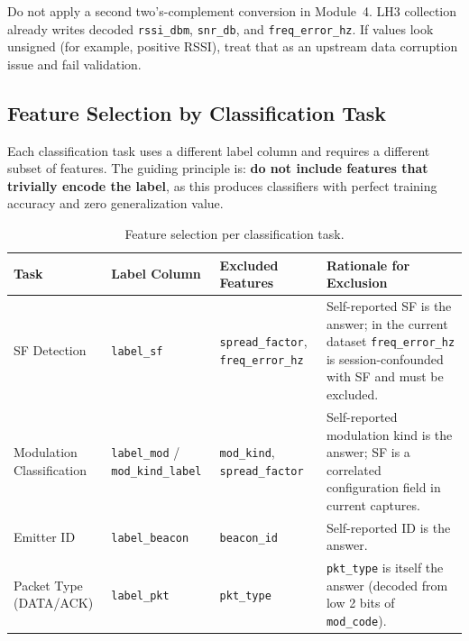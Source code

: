 \documentclass[11pt,letterpaper]{article}
\begin{document}
	\begin{tcolorbox}[warning={Common Pitfall: Double Decoding}]
		Do not apply a second two's-complement conversion in Module~4. LH3 collection already writes decoded \texttt{rssi\_dbm}, \texttt{snr\_db}, and \texttt{freq\_error\_hz}. If values look unsigned (for example, positive RSSI), treat that as an upstream data corruption issue and fail validation.
	\end{tcolorbox}

	\subsection{Feature Selection by Classification Task}

	Each classification task uses a different label column and requires a different subset of features. The guiding principle is: \textbf{do not include features that trivially encode the label}, as this produces classifiers with perfect training accuracy and zero generalization value.

	\begin{table}[ht!]
		\centering
		\caption{Feature selection per classification task.}
		\label{tab:feature_selection}
		\renewcommand{\arraystretch}{1.3}
		\begin{tabularx}{\textwidth}{l l l X}
			\toprule
			\textbf{Task} & \textbf{Label Column} & \textbf{Excluded Features} & \textbf{Rationale for Exclusion} \\
			\midrule
			SF Detection & \texttt{label\_sf} & \texttt{spread\_factor}, \texttt{freq\_error\_hz} & Self-reported SF is the answer; in the current dataset \texttt{freq\_error\_hz} is session-confounded with SF and must be excluded. \\
			Modulation Classification & \texttt{label\_mod} / \texttt{mod\_kind\_label} & \texttt{mod\_kind}, \texttt{spread\_factor} & Self-reported modulation kind is the answer; SF is a correlated configuration field in current captures. \\
			Emitter ID & \texttt{label\_beacon} & \texttt{beacon\_id} & Self-reported ID is the answer. \\
			Packet Type (DATA/ACK) & \texttt{label\_pkt} & \texttt{pkt\_type} & \texttt{pkt\_type} is itself the answer (decoded from low 2 bits of \texttt{mod\_code}). \\
			\bottomrule
		\end{tabularx}
	\end{table}
\end{document}
